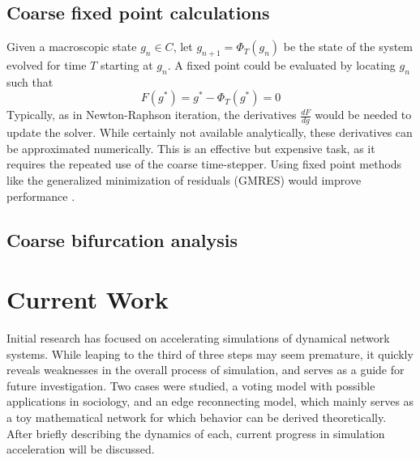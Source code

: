 \documentclass[11pt]{article}
\begin{document}
\subsection{Coarse fixed point calculations}
\indent Given a macroscopic state $g_{n} \in C$, let $g_{n+1} = \Phi_{T}(g_{n})$ be the state of the system evolved for time $T$ starting at $g_{n}$. A fixed point could be evaluated by locating $g_{n}$such that 
\[
F(g^{*}) = g^{*} - \Phi_{T}(g^{*}) = 0
\]
Typically, as in Newton-Raphson iteration, the derivatives $\frac{dF}{dg}$ would be needed to update the solver. While certainly not available analytically, these derivatives can be approximated numerically. This is an effective but expensive task, as it requires the repeated use of the coarse time-stepper. Using fixed point methods like the generalized minimization of residuals (GMRES) would improve performance \cite{GMRES}.
\subsection{Coarse bifurcation analysis}
\section{Current Work}
\indent Initial research has focused on accelerating simulations of dynamical network systems. While leaping to the third of three steps may seem premature, it quickly reveals weaknesses in the overall process of simulation, and serves as a guide for future investigation. Two cases were studied, a voting model with possible applications in sociology, and an edge reconnecting model, which mainly serves as a toy mathematical network for which behavior can be derived theoretically. After briefly describing the dynamics of each, current progress in simulation acceleration will be discussed.
\end{document}
